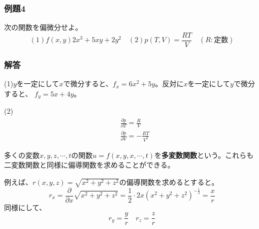 \documentclass[a4j,dvipdfmx]{jsarticle}
\begin{document}
\subsubsection*{例題4}
次の関数を偏微分せよ。
\begin{equation*}
    (1)f(x,y)2x^3+5xy+2y^2\quad(2)p(T,V)=\frac{RT}{V}\quad(R:\text{定数})
\end{equation*}
\subsubsection*{解答}
(1)$y$を一定にして$x$で微分すると、$f_x=6x^2+5y$。反対に$x$を一定にして$y$で微分すると、
$f_y=5x+4y$。

(2)\begin{align*}
    &\frac{\partial p}{\partial T}=\frac{R}{V}\\
    &\frac{\partial p}{\partial V}=-\frac{RT}{V^2}
\end{align*}

多くの変数$x,y,z,\cdots ,t$の関数$u=f(x,y,x,\cdots,t)$を\textbf{多変数関数}という。これらも二変数関数と同様に偏導関数を求めることができる。

例えば、$\displaystyle r(x,y,z)=\sqrt{x^2+y^2+z^2}$の偏導関数を求めるとすると。
\begin{equation*}
    r_x=\frac{\partial}{\partial x}\sqrt{x^2+y^2+z^2}=\frac{1}{2}\cdot 2x(x^2+y^2+z^2)^{-\frac{1}{2}}=\frac{x}{r}
\end{equation*}
同様にして、
\begin{equation*}
    r_y=\frac{y}{r}\quad r_z=\frac{z}{r}
\end{equation*}
\end{document}
